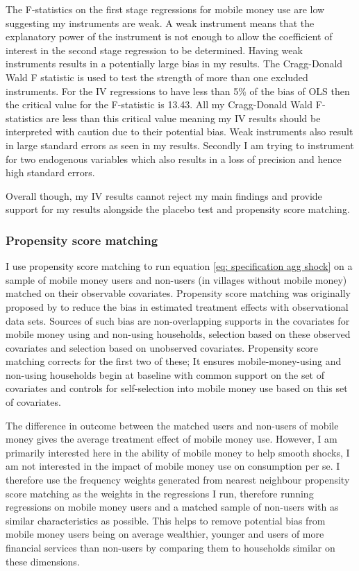 The F-statistics on the first stage regressions for mobile money use are low suggesting my instruments are weak. A weak instrument means that the explanatory power of the instrument is not enough to allow the coefficient of interest in the second stage regression to be determined. Having weak instruments results in a potentially large bias in my results. The Cragg-Donald Wald F statistic is used to test the strength of more than one excluded instruments. For the IV regressions to have less than 5\% of the bias of OLS then the critical value for the F-statistic is 13.43. All my Cragg-Donald Wald F-statistics are less than this critical value meaning my IV results should be interpreted with caution due to their potential bias. Weak instruments also result in large standard errors as seen in my results. Secondly I am trying to instrument for two endogenous variables which also results in a loss of precision and hence high standard errors. 

Overall though, my IV results cannot reject my main findings and provide support for my results alongside the placebo test and propensity score matching. 

\subsubsection{Propensity score matching}
I use propensity score matching to run equation \eqref{eq: specification agg shock} on a sample of mobile money users and non-users (in villages without mobile money) matched on their observable covariates. Propensity score matching was originally proposed by \cite{rosenbaum1983} to reduce the bias in estimated treatment effects with observational data sets. Sources of such  bias are non-overlapping supports in the covariates for mobile money using and non-using households, selection based on these observed covariates and selection based on unobserved covariates. Propensity score matching corrects for the first two of these; It ensures mobile-money-using and non-using households begin at baseline with common support on the set of covariates and controls for self-selection into mobile money use based on this set of covariates.   

The difference in outcome between the matched users and non-users of mobile money gives the average treatment effect of mobile money use. However, I am primarily interested here in the ability of mobile money to help smooth shocks, I am not interested in the impact of mobile money use on consumption per se. I therefore use the frequency weights generated from nearest neighbour propensity score matching as the weights in the regressions I run, therefore running regressions on mobile money users and a matched sample of non-users with as similar characteristics as possible. This helps to remove potential bias from mobile money users being on average wealthier, younger and users of more financial services than non-users by comparing them to households similar on these dimensions. 

